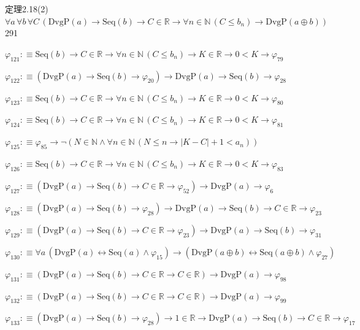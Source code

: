 \begin{fullproof}{定理2.18(2)}{$\forall a\,\forall b\,\forall C\,(\mathrm{DvgP}(a) \to \mathrm{Seq}(b) \to C \in \mathbb{R} \to \forall n \in \mathbb{N}\,(C \leq b_{n}) \to \mathrm{DvgP}(a \oplus b))$}{291}
\begin{abbrevlist}
\item $\varphi_{121} :\equiv \mathrm{Seq}(b) \to C \in \mathbb{R} \to \forall n \in \mathbb{N}\,(C \leq b_{n}) \to K \in \mathbb{R} \to 0 < K \to \varphi_{79}$
\item $\varphi_{122} :\equiv (\mathrm{DvgP}(a) \to \mathrm{Seq}(b) \to \varphi_{20}) \to \mathrm{DvgP}(a) \to \mathrm{Seq}(b) \to \varphi_{28}$
\item $\varphi_{123} :\equiv \mathrm{Seq}(b) \to C \in \mathbb{R} \to \forall n \in \mathbb{N}\,(C \leq b_{n}) \to K \in \mathbb{R} \to 0 < K \to \varphi_{80}$
\item $\varphi_{124} :\equiv \mathrm{Seq}(b) \to C \in \mathbb{R} \to \forall n \in \mathbb{N}\,(C \leq b_{n}) \to K \in \mathbb{R} \to 0 < K \to \varphi_{81}$
\item $\varphi_{125} :\equiv \varphi_{85} \to \neg (N \in \mathbb{N} \land \forall n \in \mathbb{N}\,(N \leq n \to \lvert K - C \rvert + 1 < a_{n}))$
\item $\varphi_{126} :\equiv \mathrm{Seq}(b) \to C \in \mathbb{R} \to \forall n \in \mathbb{N}\,(C \leq b_{n}) \to K \in \mathbb{R} \to 0 < K \to \varphi_{83}$
\item $\varphi_{127} :\equiv (\mathrm{DvgP}(a) \to \mathrm{Seq}(b) \to C \in \mathbb{R} \to \varphi_{52}) \to \mathrm{DvgP}(a) \to \varphi_{6}$
\item $\varphi_{128} :\equiv (\mathrm{DvgP}(a) \to \mathrm{Seq}(b) \to \varphi_{28}) \to \mathrm{DvgP}(a) \to \mathrm{Seq}(b) \to C \in \mathbb{R} \to \varphi_{23}$
\item $\varphi_{129} :\equiv (\mathrm{DvgP}(a) \to \mathrm{Seq}(b) \to C \in \mathbb{R} \to \varphi_{23}) \to \mathrm{DvgP}(a) \to \mathrm{Seq}(b) \to \varphi_{31}$
\item $\varphi_{130} :\equiv \forall a\,(\mathrm{DvgP}(a) \leftrightarrow \mathrm{Seq}(a) \land \varphi_{15}) \to (\mathrm{DvgP}(a \oplus b) \leftrightarrow \mathrm{Seq}(a \oplus b) \land \varphi_{27})$
\item $\varphi_{131} :\equiv (\mathrm{DvgP}(a) \to \mathrm{Seq}(b) \to C \in \mathbb{R} \to C \in \mathbb{R}) \to \mathrm{DvgP}(a) \to \varphi_{98}$
\item $\varphi_{132} :\equiv (\mathrm{DvgP}(a) \to \mathrm{Seq}(b) \to C \in \mathbb{R} \to C \in \mathbb{R}) \to \mathrm{DvgP}(a) \to \varphi_{99}$
\item $\varphi_{133} :\equiv (\mathrm{DvgP}(a) \to \mathrm{Seq}(b) \to \varphi_{28}) \to 1 \in \mathbb{R} \to \mathrm{DvgP}(a) \to \mathrm{Seq}(b) \to C \in \mathbb{R} \to \varphi_{17}$

\end{abbrevlist}
\end{fullproof}
